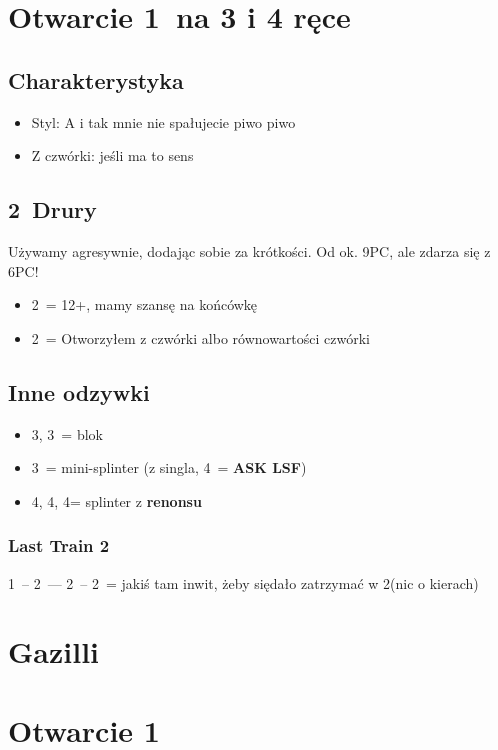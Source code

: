 \documentclass[12pt, a4paper]{article}
\newcommand{\lsf}{\color{WildStrawberry}\textbf{ASK LSF}\color{black}}
\begin{document}
\pagebreak
\section{Otwarcie 1\major\ na 3 i 4 ręce}
\subsection*{Charakterystyka}
\begin{itemize}
    \item Styl: A i tak mnie nie spałujecie piwo piwo
    \item Z czwórki: jeśli ma to sens
\end{itemize}

\subsection*{2\clubs\ Drury}
Używamy agresywnie, dodając sobie za krótkości. Od ok. 9PC, ale zdarza się z 6PC!
\begin{itemize}
    \item 2\diams\ = 12+, mamy szansę na końcówkę
    \item 2\major\ = Otworzyłem z czwórki albo równowartości czwórki
\end{itemize}

\subsection*{Inne odzywki} 
\begin{itemize}
    \item 3\hearts, 3\spades\ = blok
    \item 3\nt\ = mini-splinter (z singla, 4\clubs\ = \lsf)
    \item 4\clubs, 4\diams, 4\hearts = splinter z \textbf{renonsu}
\end{itemize}

\subsubsection*{Last Train 2\hearts}
1\spades\ -- 2\clubs\ --- 2\diams\ -- 2\hearts\ = jakiś tam inwit, żeby siędało zatrzymać w 2\spades (nic o kierach)


\section{Gazilli}
\section{Otwarcie 1\ntx}
\end{document}
